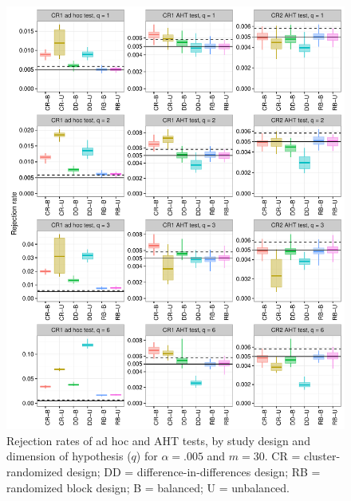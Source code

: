 \documentclass{article}\usepackage[]{graphicx}\usepackage[]{color}
\newenvironment{knitrout}{}{} %
\begin{document}
\begin{knitrout}
\color{fgcolor}\begin{figure}[H]

{\centering \includegraphics[width=\linewidth]{CR_fig/balance_005_30-1} 

}

\caption[Rejection rates of ad hoc and AHT tests, by study design and dimension of hypothesis (]{Rejection rates of ad hoc and AHT tests, by study design and dimension of hypothesis ($q$) for $\alpha = .005$ and $m = 30$. CR = cluster-randomized design; DD = difference-in-differences design; RB = randomized block design; B = balanced; U = unbalanced.}\label{fig:balance_005_30}
\end{figure}


\end{knitrout}
\end{document}
